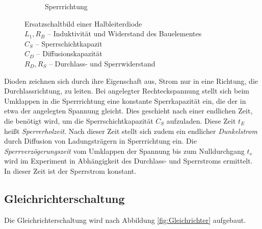 \documentclass[10pt,a4paper]{scrartcl}
\begin{document}
\begin{figure}[!ht]
\begin{subfigure}{\textwidth}
        \caption{Sperrrichtung}
    \end{subfigure}
    \caption{Ersatzschaltbild einer Halbleiterdiode\\
    $L_1,R_B$ -- Induktivität und Widerstand des Bauelementes\\
    $C_S$ -- Sperrschichtkapazit\\
    $C_D$ -- Diffusionskapazität\\
    $R_D,R_S$ -- Durchlass- und Sperrwiderstand}
    \label{fig:HL_Ersatz}
\end{figure}

Dioden zeichnen sich durch ihre Eigenschaft aus, Strom nur in eine Richtung,
die Durchlassrichtung, zu leiten.
Bei angelegter Rechteckspannung stellt sich beim Umklappen in die Sperrrichtung
eine konstante Sperrkapazität ein, die der in etwa der angelegten Spannung
gleicht.
Dies geschieht nach einer endlichen Zeit, die benötigt wird,
um die Sperrschichtkapazität $C_S$ aufzuladen.
Diese Zeit $t_E$ heißt \emph{Sperrerholzeit}.
Nach dieser Zeit stellt sich zudem ein endlicher \emph{Dunkelstrom} durch
Diffusion von Ladungsträgern in Sperrrichtung ein.
Die \emph{Sperrverzögerungszeit} vom Umklappen der Spannung bis zum
Nulldurchgang $t_s$ wird im Experiment in Abhängigkeit des Durchlass- und
Sperrstroms ermittelt.
In dieser Zeit ist der Sperrstrom konstant.

\subsection {Gleichrichterschaltung}

Die Gleichrichterschaltung wird nach Abbildung \ref{fig:Gleichrichter}
aufgebaut.
\end{document}
